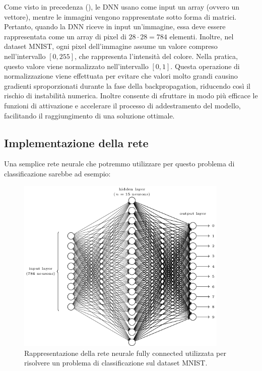 



Come visto in precedenza (), 
le DNN usano come input un array (ovvero un vettore), 
mentre le immagini vengono rappresentate sotto forma di matrici. 
Pertanto, quando la DNN riceve in input un’immagine, 
essa deve essere rappresentata come un array di pixel di $28 \cdot 28 = 784$ 
elementi.
Inoltre, nel dataset MNIST, ogni pixel dell'immagine assume un valore 
compreso nell'intervallo $[0, 255]$, che rappresenta l'intensità del colore. 
Nella pratica, questo valore viene normalizzato nell'intervallo $[0, 1]$. 
Questa operazione di normalizzazione viene effettuata per evitare che 
valori molto grandi causino  gradienti sproporzionati durante la fase della
backpropagation, riducendo così il rischio di instabilità numerica. 
Inoltre consente di sfruttare in modo più efficace 
le funzioni di attivazione e accelerare il processo di addestramento del modello, 
facilitando il raggiungimento di una soluzione ottimale.


\subsection{Implementazione della rete}
Una semplice rete neurale che potremmo utilizzare per questo problema di 
classificazione sarebbe ad esempio:

\begin{figure}[H]
    \centering
    \includegraphics[width=0.9\textwidth]{Immagini/Grafici/DNN_MNIST.png}
    \caption{Rappresentazione della rete neurale fully connected 
    utilizzata per risolvere un problema di
    classificazione sul dataset MNIST.}
    \label{fig:DNN_MNIST}
\end{figure}

